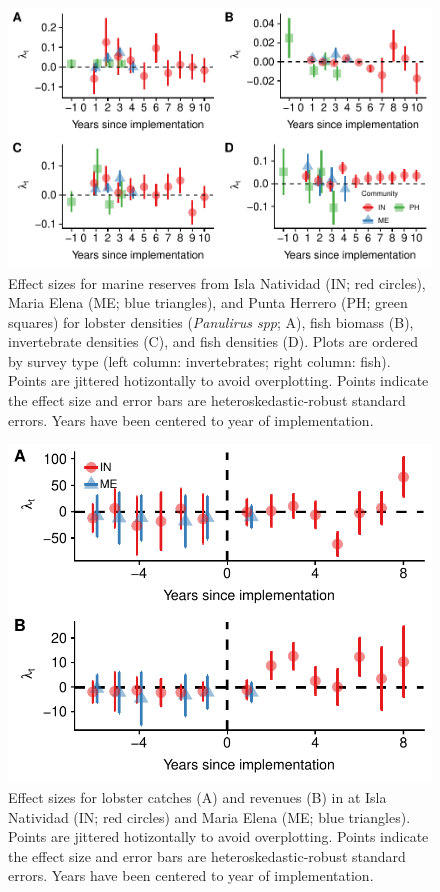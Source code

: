 \documentclass{frontiersSCNS}
\begin{document}
\begin{figure}
\centering
\includegraphics{manuscript_files/figure-latex/unnamed-chunk-8-1.pdf}
\caption{\label{fig:unnamed-chunk-8}\label{fig:indicators}Effect sizes for
marine reserves from Isla Natividad (IN; red circles), Maria Elena (ME;
blue triangles), and Punta Herrero (PH; green squares) for lobster
densities (\emph{Panulirus spp}; A), fish biomass (B), invertebrate
densities (C), and fish densities (D). Plots are ordered by survey type
(left column: invertebrates; right column: fish). Points are jittered
hotizontally to avoid overplotting. Points indicate the effect size and
error bars are heteroskedastic-robust standard errors. Years have been
centered to year of implementation.}
\end{figure}

\begin{figure}
\centering
\includegraphics{manuscript_files/figure-latex/unnamed-chunk-9-1.pdf}
\caption{\label{fig:unnamed-chunk-9}\label{fig:lobsters}Effect sizes for
lobster catches (A) and revenues (B) in at Isla Natividad (IN; red
circles) and Maria Elena (ME; blue triangles). Points are jittered
hotizontally to avoid overplotting. Points indicate the effect size and
error bars are heteroskedastic-robust standard errors. Years have been
centered to year of implementation.}
\end{figure}
\end{document}
